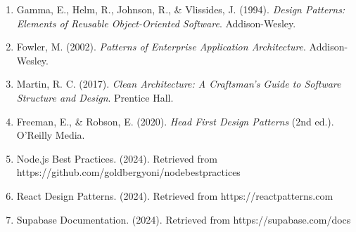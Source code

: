 \documentclass[12pt,a4paper]{article}
\begin{document}
\begin{enumerate}
    \item Gamma, E., Helm, R., Johnson, R., \& Vlissides, J. (1994). \textit{Design Patterns: Elements of Reusable Object-Oriented Software}. Addison-Wesley.
    
    \item Fowler, M. (2002). \textit{Patterns of Enterprise Application Architecture}. Addison-Wesley.
    
    \item Martin, R. C. (2017). \textit{Clean Architecture: A Craftsman's Guide to Software Structure and Design}. Prentice Hall.
    
    \item Freeman, E., \& Robson, E. (2020). \textit{Head First Design Patterns} (2nd ed.). O'Reilly Media.
    
    \item Node.js Best Practices. (2024). Retrieved from https://github.com/goldbergyoni/nodebestpractices
    
    \item React Design Patterns. (2024). Retrieved from https://reactpatterns.com
    
    \item Supabase Documentation. (2024). Retrieved from https://supabase.com/docs
\end{enumerate}
\end{document}
